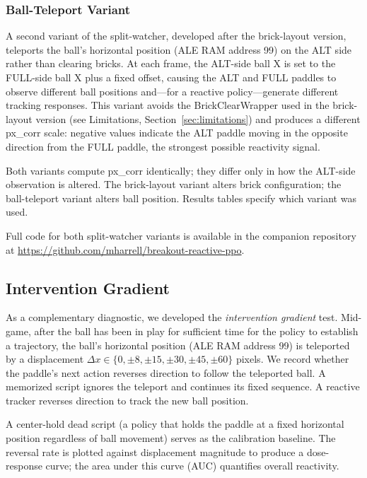 \documentclass[11pt]{article}
\begin{document}
\subsubsection{Ball-Teleport Variant}

A second variant of the split-watcher, developed after the brick-layout version,
teleports the ball's horizontal position (ALE RAM address 99) on the ALT side
rather than clearing bricks. At each frame, the ALT-side ball X is set to the
FULL-side ball X plus a fixed offset, causing the ALT and FULL paddles to
observe different ball positions and---for a reactive policy---generate
different tracking responses. This variant avoids the BrickClearWrapper used
in the brick-layout version (see Limitations, Section~\ref{sec:limitations})
and produces a different px\_corr scale: negative values indicate the ALT paddle
moving in the opposite direction from the FULL paddle, the strongest possible
reactivity signal.

Both variants compute px\_corr identically; they differ only in how the ALT-side
observation is altered. The brick-layout variant alters brick configuration;
the ball-teleport variant alters ball position. Results tables specify which
variant was used.

Full code for both split-watcher variants is available in the companion
repository at \url{https://github.com/mharrell/breakout-reactive-ppo}.

\subsection{Intervention Gradient}

As a complementary diagnostic, we developed the \emph{intervention gradient}
test. Mid-game, after the ball has been in play for sufficient time for the
policy to establish a trajectory, the ball's horizontal position (ALE RAM
address 99) is teleported by a displacement $\Delta x \in \{0, \pm8, \pm15,
\pm30, \pm45, \pm60\}$ pixels. We record whether the paddle's next action
reverses direction to follow the teleported ball. A memorized script ignores
the teleport and continues its fixed sequence. A reactive tracker reverses
direction to track the new ball position.

A center-hold dead script (a policy that holds the paddle at a fixed horizontal
position regardless of ball movement) serves as the calibration baseline.
The reversal rate is plotted against displacement magnitude to produce a
dose-response curve; the area under this curve (AUC) quantifies overall
reactivity.
\end{document}
